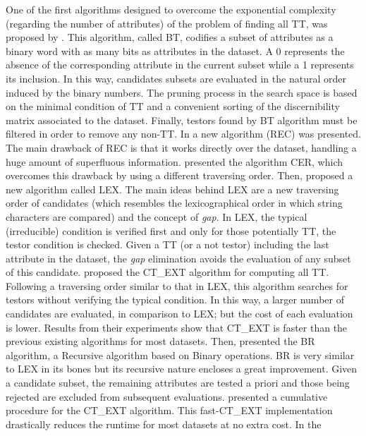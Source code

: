 \documentclass[authoryear,preprint,review,12pt]{elsarticle}
\begin{document}
    One of the first algorithms designed to overcome the exponential complexity (regarding
  the number of attributes) of the problem of finding all TT, was 
  proposed by \cite{Ruiz85}. This algorithm, called BT,
  codifies a subset of attributes as a binary word with as many bits as attributes in the 
  dataset. A 0 represents the absence of the corresponding attribute in the current
  subset while a 1 represents its inclusion. In this way, candidates subsets are evaluated
  in the natural order induced by the binary numbers. The pruning process in the
  search space is based on the minimal condition of TT and a convenient sorting
  of the discernibility matrix associated to the dataset. Finally, 
  testors found by BT algorithm must be filtered in order to remove any non-TT.
  In \citep{Shulcloper95b} a new algorithm (REC) was presented.
  The main drawback of REC is that it works directly over the dataset, handling a huge amount of superfluous
  information. \cite{Ayaquica97} presented the algorithm CER, which overcomes this drawback by using a different
  traversing order.  Then, \cite{Santiesteban03} proposed a new algorithm called LEX. The main ideas 
  behind LEX are a new traversing order of candidates (which resembles the
  lexicographical order in which string characters are compared) and the concept of \emph{gap}. In LEX,
  the typical (irreducible) condition is verified first and only for those potentially TT, the testor 
  condition is checked. Given a TT (or a not testor) including the last attribute in the dataset, the \emph{gap} 
  elimination avoids the evaluation of any subset of this candidate.
  \cite{Sanchez07} proposed the CT\_EXT algorithm for computing all
  TT. Following a traversing order similar to that in LEX, this algorithm searches for
  testors without verifying the typical condition. In this way, a larger number of candidates are 
  evaluated, in comparison to LEX; but the cost of each evaluation is lower. Results from their experiments
  show that CT\_EXT is faster than the previous existing algorithms for most datasets. Then, \cite{Lias09}
  presented the BR algorithm, a Recursive algorithm based on 
  Binary operations. BR is very similar to LEX in its bones but its recursive nature encloses a great
  improvement. Given a candidate subset, the remaining attributes are tested a priori and those being 
  rejected are excluded from subsequent evaluations. \cite{Sanchez10} presented a cumulative
  procedure for the CT\_EXT algorithm. This fast-CT\_EXT implementation drastically reduces the runtime
  for most datasets at no extra cost. In \citep{Lias13} the
\end{document}
